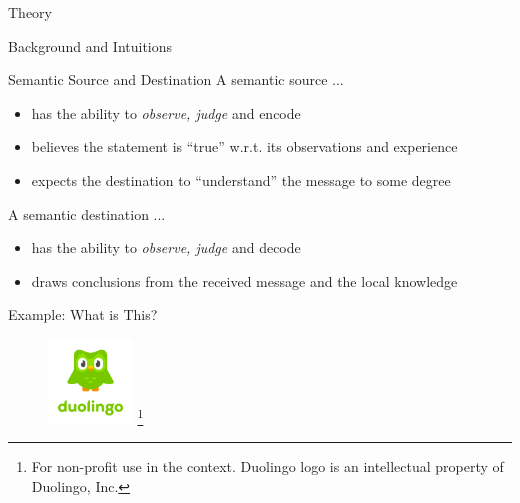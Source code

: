 \documentclass[presentation,mathserif,9pt]{beamer}
\begin{document}
\begin{section}{Theory}
\begin{subsection}{Background and Intuitions}
		\begin{frame}{Semantic Source and Destination}
			A semantic source ...
			\begin{itemize}
				\item has the ability to \emph{observe, judge} and encode
				\item believes the statement is ``true'' w.r.t. its observations and experience
				\item expects the destination to ``understand'' the message to some degree
			\end{itemize}
			A semantic destination ...
			\begin{itemize}
				\item has the ability to \emph{observe, judge} and decode
				\item draws conclusions from the received message and the local knowledge
			\end{itemize}
			\begin{exampleblock}{Example: What is This?}
				\begin{figure}
					\includegraphics[width=0.2\textwidth]{assets/duolingo.png}
					\footnote[frame]{For non-profit use in the context. Duolingo logo is an intellectual property of Duolingo, Inc.}
				\end{figure}
			\end{exampleblock}
		\end{frame}

	\end{subsection}


\end{section}
\end{document}
